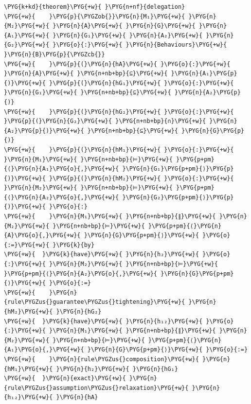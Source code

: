 \begin{Verbatim}[commandchars=\\\{\},fontsize=\footnotesize]
\PYG{k+kd}{theorem}\PYG{+w}{ }\PYG{n+nf}{delegation}
\PYG{+w}{    }\PYG{p}{\PYGZob{}}\PYG{n}{M₁}\PYG{+w}{ }\PYG{n}{M₂}\PYG{+w}{ }\PYG{n}{A}\PYG{+w}{ }\PYG{n}{G}\PYG{+w}{ }\PYG{n}{A₁}\PYG{+w}{ }\PYG{n}{G₁}\PYG{+w}{ }\PYG{n}{A₂}\PYG{+w}{ }\PYG{n}{G₂}\PYG{+w}{ }\PYG{o}{:}\PYG{+w}{ }\PYG{n}{Behaviours}\PYG{+w}{ }\PYG{n}{B}\PYG{p}{\PYGZcb{}}
\PYG{+w}{    }\PYG{p}{(}\PYG{n}{hA}\PYG{+w}{ }\PYG{o}{:}\PYG{+w}{ }\PYG{n}{A}\PYG{+w}{ }\PYG{n+nb+bp}{⊆}\PYG{+w}{ }\PYG{n}{A₁}\PYG{p}{)}\PYG{+w}{ }\PYG{p}{(}\PYG{n}{hG₁}\PYG{+w}{ }\PYG{o}{:}\PYG{+w}{ }\PYG{n}{G₁}\PYG{+w}{ }\PYG{n+nb+bp}{⊆}\PYG{+w}{ }\PYG{n}{A₂}\PYG{p}{)}
\PYG{+w}{    }\PYG{p}{(}\PYG{n}{hG₂}\PYG{+w}{ }\PYG{o}{:}\PYG{+w}{ }\PYG{p}{(}\PYG{n}{G₂}\PYG{+w}{ }\PYG{n+nb+bp}{∩}\PYG{+w}{ }\PYG{n}{A₂}\PYG{p}{)}\PYG{+w}{ }\PYG{n+nb+bp}{⊆}\PYG{+w}{ }\PYG{n}{G}\PYG{p}{)}
\PYG{+w}{    }\PYG{p}{(}\PYG{n}{hM₁}\PYG{+w}{ }\PYG{o}{:}\PYG{+w}{ }\PYG{n}{M₁}\PYG{+w}{ }\PYG{n+nb+bp}{⊨}\PYG{+w}{ }\PYG{p+pm}{⟨}\PYG{n}{A₁}\PYG{o}{,}\PYG{+w}{ }\PYG{n}{G₁}\PYG{p+pm}{⟩}\PYG{p}{)}\PYG{+w}{ }\PYG{p}{(}\PYG{n}{hM₂}\PYG{+w}{ }\PYG{o}{:}\PYG{+w}{ }\PYG{n}{M₂}\PYG{+w}{ }\PYG{n+nb+bp}{⊨}\PYG{+w}{ }\PYG{p+pm}{⟨}\PYG{n}{A₂}\PYG{o}{,}\PYG{+w}{ }\PYG{n}{G₂}\PYG{p+pm}{⟩}\PYG{p}{)}\PYG{+w}{ }\PYG{o}{:}
\PYG{+w}{    }\PYG{n}{M₁}\PYG{+w}{ }\PYG{n+nb+bp}{∥}\PYG{+w}{ }\PYG{n}{M₂}\PYG{+w}{ }\PYG{n+nb+bp}{⊨}\PYG{+w}{ }\PYG{p+pm}{⟨}\PYG{n}{A}\PYG{o}{,}\PYG{+w}{ }\PYG{n}{G}\PYG{p+pm}{⟩}\PYG{+w}{ }\PYG{o}{:=}\PYG{+w}{ }\PYG{k}{by}
\PYG{+w}{  }\PYG{k}{have}\PYG{+w}{ }\PYG{n}{h₂}\PYG{+w}{ }\PYG{o}{:}\PYG{+w}{ }\PYG{n}{M₂}\PYG{+w}{ }\PYG{n+nb+bp}{⊨}\PYG{+w}{ }\PYG{p+pm}{⟨}\PYG{n}{A₂}\PYG{o}{,}\PYG{+w}{ }\PYG{n}{G}\PYG{p+pm}{⟩}\PYG{+w}{ }\PYG{o}{:=}
\PYG{+w}{    }\PYG{n}{rule\PYGZus{}guarantee\PYGZus{}tightening}\PYG{+w}{ }\PYG{n}{hM₂}\PYG{+w}{ }\PYG{n}{hG₂}
\PYG{+w}{  }\PYG{k}{have}\PYG{+w}{ }\PYG{n}{h₁₂}\PYG{+w}{ }\PYG{o}{:}\PYG{+w}{ }\PYG{n}{M₁}\PYG{+w}{ }\PYG{n+nb+bp}{∥}\PYG{+w}{ }\PYG{n}{M₂}\PYG{+w}{ }\PYG{n+nb+bp}{⊨}\PYG{+w}{ }\PYG{p+pm}{⟨}\PYG{n}{A₁}\PYG{o}{,}\PYG{+w}{ }\PYG{n}{G}\PYG{p+pm}{⟩}\PYG{+w}{ }\PYG{o}{:=}
\PYG{+w}{    }\PYG{n}{rule\PYGZus{}composition}\PYG{+w}{ }\PYG{n}{hM₁}\PYG{+w}{ }\PYG{n}{h₂}\PYG{+w}{ }\PYG{n}{hG₁}
\PYG{+w}{  }\PYG{n}{exact}\PYG{+w}{ }\PYG{n}{rule\PYGZus{}assumption\PYGZus{}relaxation}\PYG{+w}{ }\PYG{n}{h₁₂}\PYG{+w}{ }\PYG{n}{hA}
\end{Verbatim}
